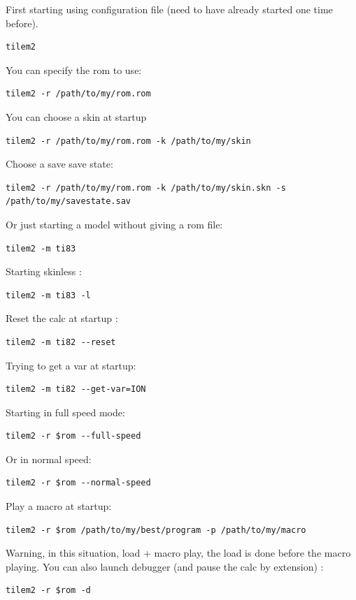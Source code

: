 \documentclass[10pt]{report}
\begin{document}
First starting using configuration file (need to have already started one time before). 
\begin{lstlisting}
tilem2
\end{lstlisting}
You can specify the rom to use:\newline
\begin{lstlisting}
tilem2 -r /path/to/my/rom.rom
\end{lstlisting}
You can choose a skin at startup
\begin{lstlisting}
tilem2 -r /path/to/my/rom.rom -k /path/to/my/skin
\end{lstlisting}
Choose a save save state: \newline
\begin{lstlisting}
tilem2 -r /path/to/my/rom.rom -k /path/to/my/skin.skn -s /path/to/my/savestate.sav
\end{lstlisting}
Or just starting a model without giving a rom file:\newline
\begin{lstlisting}
tilem2 -m ti83
\end{lstlisting}
Starting skinless :\newline
\begin{lstlisting}
tilem2 -m ti83 -l
\end{lstlisting}
Reset the calc at startup :\newline
\begin{lstlisting}
tilem2 -m ti82 --reset
\end{lstlisting}
Trying to get a var at startup:\newline
\begin{lstlisting}
tilem2 -m ti82 --get-var=ION
\end{lstlisting}
Starting in full speed mode:\newline
\begin{lstlisting}
tilem2 -r $rom --full-speed
\end{lstlisting}
Or in normal speed:
\begin{lstlisting}
tilem2 -r $rom --normal-speed
\end{lstlisting}
Play a macro at startup:\newline
\begin{lstlisting}
tilem2 -r $rom /path/to/my/best/program -p /path/to/my/macro
\end{lstlisting}
Warning, in this situation, load + macro play, the load is done before the macro playing.\newline\newline
You can also launch debugger (and pause the calc by extension) :\newline
\begin{lstlisting}
tilem2 -r $rom -d
\end{lstlisting}
\end{document}
